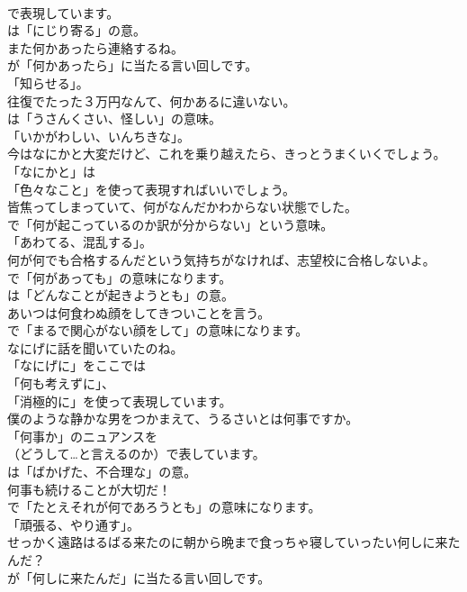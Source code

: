 \documentclass[8pt]{extreport}
\begin{document}
\begin{CJK}{UTF8}{min}
\\	で表現しています。
\\	は「にじり寄る」の意。	
\\	また何かあったら連絡するね。 
\\	が「何かあったら」に当たる言い回しです。
\\	「知らせる」。	
\\	往復でたった３万円なんて、何かあるに違いない。 
\\	は「うさんくさい、怪しい」の意味。
\\	「いかがわしい、いんちきな」。	
\\	今はなにかと大変だけど、これを乗り越えたら、きっとうまくいくでしょう。 
\\	「なにかと」は
\\	「色々なこと」を使って表現すればいいでしょう。	
\\	皆焦ってしまっていて、何がなんだかわからない状態でした。 
\\	で「何が起こっているのか訳が分からない」という意味。
\\	「あわてる、混乱する」。	
\\	何が何でも合格するんだという気持ちがなければ、志望校に合格しないよ。 
\\	で「何があっても」の意味になります。
\\	は「どんなことが起きようとも」の意。	
\\	あいつは何食わぬ顔をしてきついことを言う。 
\\	で「まるで関心がない顔をして」の意味になります。	
\\	なにげに話を聞いていたのね。 
\\	「なにげに」をここでは
\\	「何も考えずに」、
\\	「消極的に」を使って表現しています。	
\\	僕のような静かな男をつかまえて、うるさいとは何事ですか。 
\\	「何事か」のニュアンスを 
\\	（どうして…と言えるのか）で表しています。
\\	は「ばかげた、不合理な」の意。	
\\	何事も続けることが大切だ！ 
\\	で「たとえそれが何であろうとも」の意味になります。
\\	「頑張る、やり通す」。	
\\	せっかく遠路はるばる来たのに朝から晩まで食っちゃ寝していったい何しに来たんだ？ 
\\	が「何しに来たんだ」に当たる言い回しです。

\end{CJK}
\end{document}
